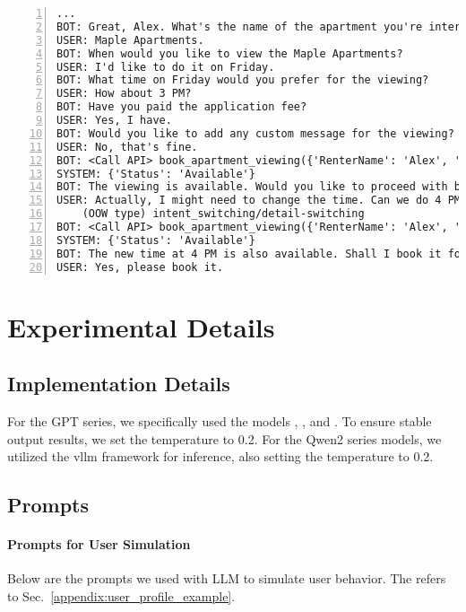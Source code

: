 \begin{envnew}
\begin{lstlisting}[language={}, caption=Example conversation on STAR, numbers=left]
...
BOT: Great, Alex. What's the name of the apartment you're interested in?
USER: Maple Apartments.
BOT: When would you like to view the Maple Apartments?
USER: I'd like to do it on Friday.
BOT: What time on Friday would you prefer for the viewing?
USER: How about 3 PM?
BOT: Have you paid the application fee?
USER: Yes, I have.
BOT: Would you like to add any custom message for the viewing?
USER: No, that's fine.
BOT: <Call API> book_apartment_viewing({'RenterName': 'Alex', 'Name': 'Maple Apartments', 'Day': 'Friday', 'StartTimeHour': '15', 'ApplicationFeePaid': 'Yes', 'Message': '', 'RequestType': 'CheckAvailability'})
SYSTEM: {'Status': 'Available'}
BOT: The viewing is available. Would you like to proceed with booking?
USER: Actually, I might need to change the time. Can we do 4 PM instead?
    (OOW type) intent_switching/detail-switching
BOT: <Call API> book_apartment_viewing({'RenterName': 'Alex', 'Name': 'Maple Apartments', 'Day': 'Friday', 'StartTimeHour': '16', 'ApplicationFeePaid': 'Yes', 'Message': '', 'RequestType': 'CheckAvailability'})
SYSTEM: {'Status': 'Available'}
BOT: The new time at 4 PM is also available. Shall I book it for you?
USER: Yes, please book it.
\end{lstlisting}


\section{Experimental Details} \label{appendix:exp_details}
\subsection{Implementation Details} \label{appendix:implementation_details}

For the GPT series, we specifically used the models , , and . To ensure stable output results, we set the temperature to 0.2. For the Qwen2 series models, we utilized the vllm framework for inference, also setting the temperature to 0.2.


\subsection{Prompts} \label{appendix:prompts}

\paragraph{Prompts for User Simulation}
Below are the prompts we used with LLM to simulate user behavior. The  refers to Sec.~\ref{appendix:user_profile_example}. 


\end{envnew}
